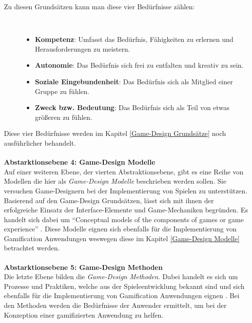 \documentclass[a4paper,12pt]{scrartcl}
\begin{document}
\begin{description}
   \item[Zu diesen Grundsätzen kann man diese vier Bedürfnisse zählen:]~\par
   \begin{itemize}
      \item \textbf{Kompetenz}: Umfasst das Bedürfnis, Fähigkeiten zu erlernen und Herausforderungen zu meistern. 
      \item \textbf{Autonomie}: Das Bedürfnis sich frei zu entfalten und kreativ zu sein.
      \item \textbf{Soziale Eingebundenheit}: Das Bedürfnis sich als Mitglied einer Gruppe zu fühlen.
      \item \textbf{Zweck bzw. Bedeutung}: Das Bedürfnis sich als Teil von etwas größeren zu fühlen.
   \end{itemize}
\end{description}
Diese vier Bedürfnisse werden im Kapitel \ref{Game-Design Grundsätze} noch ausführlicher behandelt.
\\\\
\textbf{Abstarktionsebene 4: Game-Design Modelle}
\\
Auf einer weiteren Ebene, der vierten Abstraktionsebene, gibt es eine Reihe von Modellen die hier als \textit{Game-Design Modelle} beschrieben werden sollen. Sie versuchen Game-Designern bei der Implementierung von Spielen zu unterstützen. Basierend auf den Game-Design Grundsätzen, lässt sich mit ihnen der erfolgreiche Einsatz der Interface-Elemente und Game-Mechaniken begründen. Es handelt sich dabei um \enquote{Conceptual models of the components of games or game experience} \cite{Deterding2011}. Diese Modelle eignen sich ebenfalls für die Implementierung von Gamification Anwendungen weswegen diese im Kapitel \ref{Game-Design Modelle} betrachtet werden.
\\\\
\textbf{Abstarktionsebene 5: Game-Design Methoden}\\
Die letzte Ebene bilden die \textit{Game-Design Methoden}. Dabei handelt es sich um Prozesse und Praktiken, welche aus der Spieleentwicklung bekannt sind und sich ebenfalls für die Implementierung von Gamification Anwendungen eignen \cite{GameElemente2018}. Bei den Methoden werden die Bedürfnisse der Anwender ermittelt, um bei der Konzeption einer gamifizierten Anwendung zu helfen. 
\\
\end{document}
